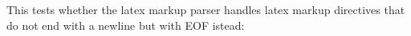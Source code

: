 This tests whether the latex markup parser handles latex markup directives
that do not end with a newline but with EOF istead:

